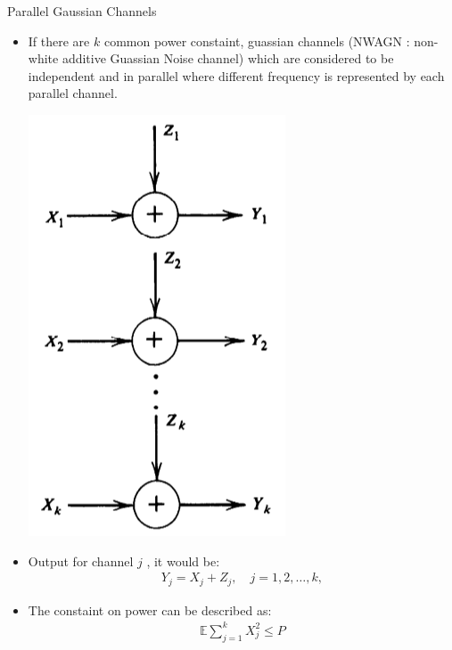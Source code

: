 \documentclass{beamer}
\begin{document}
\begin{frame}{Parallel Gaussian Channels}
 \begin{itemize}
	\justifying
\item If there are  $k$ common power constaint, guassian channels (NWAGN : non-white additive Guassian Noise channel) which are considered to be independent and in parallel where different frequency is represented by each parallel channel.
\begin{center}
	\includegraphics[scale=0.15]{Diagrams/parallel_guassian_channels.png}
\end{center} 
\item Output for channel $j$ , it would be: \begin{eqnarray}
    Y_j = X_j + Z_j, \quad j = 1, 2, \dots, k,
\end{eqnarray}
%

\item The constaint on power can be described as:
%
\begin{eqnarray}
    \mathbb{E} \sum_{j=1}^{k} X_j^2 \leq P
\end{eqnarray}
%


	\end{itemize}
\end{frame}
\end{document}
